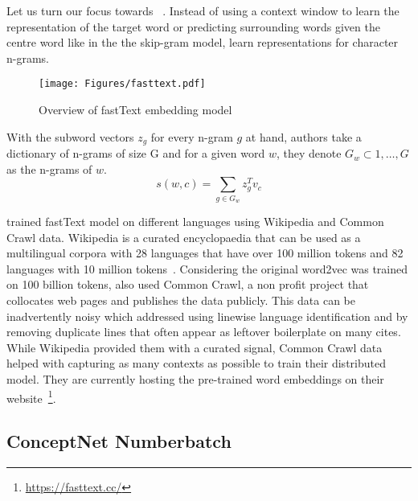 Let us turn our focus towards ~\cite{bojanowski_enriching_2016}.
Instead of using a context window to learn the representation of the target word or predicting surrounding words given the centre word like in the the skip-gram model, \citeauthor{bojanowski_enriching_2016} learn representations for character n-grams.

\begin{figure}[htbp]
    \centering
    \texttt{[image: Figures/fasttext.pdf]}
    \caption{Overview of fastText embedding model}%
    \label{fig:fasttext}
\end{figure}
With the subword vectors $z_g$ for every n-gram $g$ at hand, authors take a dictionary of n-grams of size G and for a given word $w$, they denote $G_{w} \subset {1, \dots, G}$ as the n-grams of $w$.
\begin{displaymath}
    s(w,c) = \sum_{g \in G_{w}}z_{g}^T v_c
\end{displaymath}

\textcite{grave_learning_2018} trained fastText model on different languages using Wikipedia and Common Crawl data.
Wikipedia is a curated encyclopaedia that can be used as a multilingual corpora with 28 languages that have over 100 million tokens and 82 languages with 10 million tokens~\cite{grave_learning_2018}.
Considering the original word2vec was trained on 100 billion tokens, \citeauthor{grave_learning_2018} also used Common Crawl, a non profit project that collocates web pages and publishes the data publicly.
This data can be inadvertently noisy which \citeauthor{grave_learning_2018} addressed using linewise language identification and by removing duplicate lines that often appear as leftover boilerplate on many cites.
While Wikipedia provided them with a curated signal, Common Crawl data helped with capturing as many contexts as possible to train their distributed model.
They are currently hosting the pre-trained word embeddings on their website~\footnote{\url{https://fasttext.cc/}}.

\subsection{ConceptNet Numberbatch}%
\label{sub:conceptnet_numberbatch}

